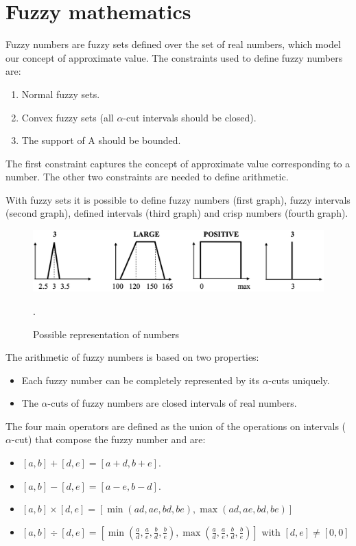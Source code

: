 \documentclass[12pt, a4paper]{report}
\theoremstyle{remark}
\begin{document}
    \section{Fuzzy mathematics}
    Fuzzy numbers are fuzzy sets defined over the set of real numbers, which model our concept of approximate value. The constraints used to 
    define fuzzy numbers are: 
    \begin{enumerate}
        \item Normal fuzzy sets.
        \item Convex fuzzy sets (all $\alpha$-cut intervals should be closed).
        \item The support of A should be bounded. 
    \end{enumerate}
    The first constraint captures the concept of approximate value corresponding to a number. The other two constraints are needed to define 
    arithmetic. 

    With fuzzy sets it is possible to define fuzzy numbers (first graph), fuzzy intervals (second graph), defined intervals (third graph) and 
    crisp numbers (fourth graph). 
    \begin{figure}[H]
        \centering
        \includegraphics[width=0.75\linewidth]{images/numbers.png}
        \caption{Possible representation of numbers}.
    \end{figure}

    The arithmetic of fuzzy numbers is based on two properties:
    \begin{itemize}
        \item Each fuzzy number can be completely represented by its $\alpha$-cuts uniquely. 
        \item The $\alpha$-cuts of fuzzy numbers are closed intervals of real numbers. 
    \end{itemize}

    The four main operators are defined as the union of the operations on intervals ($\alpha$-cut) that compose the fuzzy number and are: 
    \begin{itemize}
        \item $[a,b]+[d,e]=[a+d,b+e]$.
        \item $[a,b]-[d,e]=[a-e,b-d]$.
        \item $[a,b] \times [d,e]=[\min (ad,ae,bd,be),\max (ad,ae,bd,be)]$
        \item $[a,b] \div [d,e]=[\min (\frac{a}{d},\frac{a}{e},\frac{b}{d},\frac{b}{e}),\max (\frac{a}{d},\frac{a}{e},\frac{b}{d},\frac{b}{e})]$ with $[d,e] \neq [0,0]$
    \end{itemize}
\end{document}
